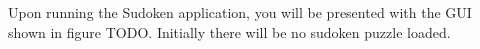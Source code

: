 Upon running the Sudoken application, you will be presented with the GUI shown in figure TODO. Initially there will be no sudoken puzzle loaded.
